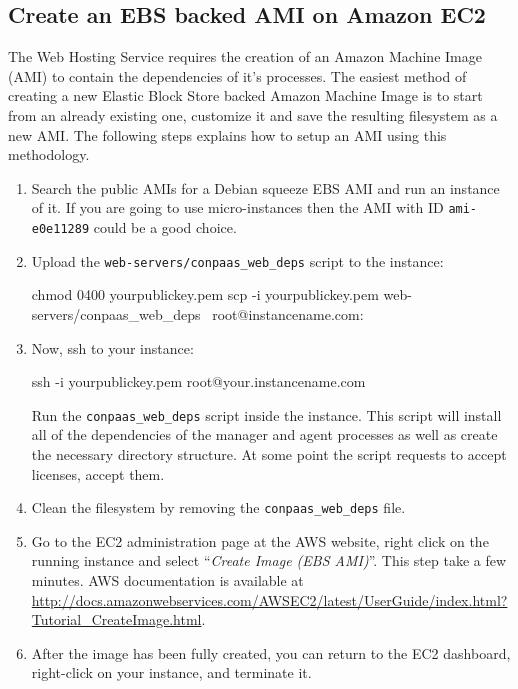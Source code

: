 \documentclass[10pt]{article}
\begin{document}
\subsection{Create an EBS backed AMI on Amazon EC2}

The Web Hosting Service requires the creation of an Amazon Machine
Image (AMI) to contain the dependencies of it's processes.  The
easiest method of creating a new Elastic Block Store backed Amazon
Machine Image is to start from an already existing one, customize it
and save the resulting filesystem as a new AMI. The following steps
explains how to setup an AMI using this methodology.

\begin{enumerate}
\item Search the public AMIs for a Debian squeeze EBS AMI and run an
  instance of it. If you are going to use micro-instances then the AMI
  with ID \verb+ami-e0e11289+ could be a good choice.

\item Upload the \verb+web-servers/conpaas_web_deps+ script to the instance:
  \begin{code}
    chmod 0400 yourpublickey.pem
    scp -i yourpublickey.pem web-servers/conpaas_web_deps \
      root@instancename.com:
  \end{code}

\item Now, ssh to your instance:
  \begin{code}
    ssh -i yourpublickey.pem root@your.instancename.com
  \end{code}
  Run the \verb+conpaas_web_deps+ script inside the instance. This
  script will install all of the dependencies of the manager and agent
  processes as well as create the necessary directory structure. At
  some point the script requests to accept licenses, accept them.

\item Clean the filesystem by removing the \verb+conpaas_web_deps+
  file.

\item Go to the EC2 administration page at the AWS website, right
  click on the running instance and select ``\emph{Create Image (EBS
    AMI)}''.  This step take a few minutes. AWS documentation is
  available at
  \url{http://docs.amazonwebservices.com/AWSEC2/latest/UserGuide/index.html?Tutorial_CreateImage.html}.

\item After the image has been fully created, you can return to the
  EC2 dashboard, right-click on your instance, and terminate it.
\end{enumerate}
\end{document}
